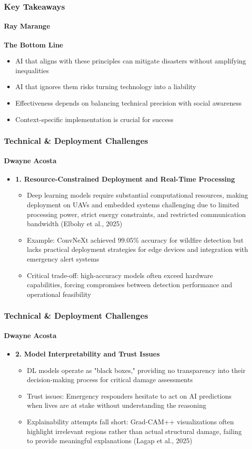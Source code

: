 \documentclass{beamer}
\newcommand{\namedframe}[3]{
  \begin{frame}
    \frametitle{#2}
    \framesubtitle{#1}
    #3
  \end{frame}
}
\begin{document}
\namedframe{Ray Marange}{Key Takeaways}{
\textbf{The Bottom Line}
\begin{itemize}
  \item AI that aligns with these principles can mitigate disasters without amplifying inequalities
  \item AI that ignores them risks turning technology into a liability
  \item Effectiveness depends on balancing technical precision with social awareness
  \item Context-specific implementation is crucial for success
\end{itemize}
}

\namedframe{Dwayne Acosta}{Technical \& Deployment Challenges}{
\begin{itemize}
    \item \textbf{1. Resource-Constrained Deployment and Real-Time Processing}
    \begin{itemize}
        \item Deep learning models require substantial computational resources, making deployment on UAVs and embedded systems challenging due to limited processing power, strict energy constraints, and restricted communication bandwidth (Elbohy et al., 2025)
        \item Example: ConvNeXt achieved 99.05\% accuracy for wildfire detection but lacks practical deployment strategies for edge devices and integration with emergency alert systems
        \item Critical trade-off: high-accuracy models often exceed hardware capabilities, forcing compromises between detection performance and operational feasibility
    \end{itemize}
\end{itemize}
}

\namedframe{Dwayne Acosta}{Technical \& Deployment Challenges}{
\begin{itemize}
    \item \textbf{2. Model Interpretability and Trust Issues}
    \begin{itemize}
        \item DL models operate as "black boxes," providing no transparency into their decision-making process for critical damage assessments
        \item Trust issues: Emergency responders hesitate to act on AI predictions when lives are at stake without understanding the reasoning
        \item Explainability attempts fall short: Grad-CAM++ visualizations often highlight irrelevant regions rather than actual structural damage, failing to provide meaningful explanations (Lagap et al., 2025)
    \end{itemize}
\end{itemize}
}
\end{document}

